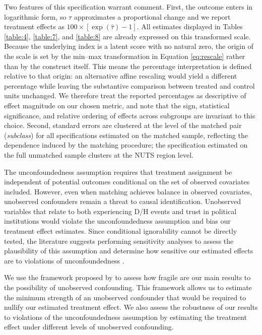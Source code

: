 \documentclass{article}
\begin{document}
Two features of this specification warrant comment. First, the outcome enters in logarithmic form, so \( \tau \) approximates a proportional change and we report treatment effects as \( 100 \times [\exp(\hat{\tau}) - 1] \). All estimates displayed in Tables \ref{table:4}, \ref{table:7}, and \ref{table:8} are already expressed on this transformed scale. Because the underlying index is a latent score with no natural zero, the origin of the scale is set by the min--max transformation in Equation \ref{eq:rescale} rather than by the construct itself. This means the percentage interpretation is defined relative to that origin: an alternative affine rescaling would yield a different percentage while leaving the substantive comparison between treated and control units unchanged. We therefore treat the reported percentages as descriptive of effect magnitude on our chosen metric, and note that the sign, statistical significance, and relative ordering of effects across subgroups are invariant to this choice. Second, standard errors are clustered at the level of the matched pair (\emph{subclass}) for all specifications estimated on the matched sample, reflecting the dependence induced by the matching procedure; the specification estimated on the full unmatched sample clusters at the NUTS region level.

The unconfoundedness assumption requires that treatment assignment be independent of potential outcomes conditional on the set of observed covariates included. However, even when matching achieves balance in observed covariates, unobserved confounders remain a threat to causal identification. Unobserved variables that relate to both experiencing D/H events and trust in political institutions would violate the unconfoundedness assumption and bias our treatment effect estimates. Since conditional ignorability cannot be directly tested, the literature suggests performing sensitivity analyses to assess the plausibility of this assumption and determine how sensitive our estimated effects are to violations of unconfoundedness \parencite{stuart_matching_2010}.

We use the framework proposed by \textcite{cinelli_making_2020} to assess how fragile are our main results to the possibility of unobserved confounding. This framework allows us to estimate the minimum strength of an unobserved confounder that would be required to nullify our estimated treatment effect. We also assess the robustness of our results to violations of the unconfoundedness assumption by estimating the treatment effect under different levels of unobserved confounding.
\end{document}
